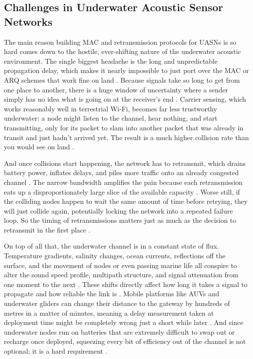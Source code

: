 \documentclass{article}
\begin{document}
\subsection{Challenges in Underwater Acoustic Sensor Networks}
The main reason building MAC and retransmission protocols for UASNs is so hard comes down to the hostile, ever-shifting nature of the underwater acoustic environment. The single biggest headache is the long and unpredictable propagation delay, which makes it nearly impossible to just port over the MAC or ARQ schemes that work fine on land \cite{akyildiz2005,slottedfama2006}. Because signals take so long to get from one place to another, there is a huge window of uncertainty where a sender simply has no idea what is going on at the receiver's end \cite{casari2011,kulla2022}. Carrier sensing, which works reasonably well in terrestrial Wi-Fi, becomes far less trustworthy underwater: a node might listen to the channel, hear nothing, and start transmitting, only for its packet to slam into another packet that was already in transit and just hadn't arrived yet. The result is a much higher collision rate than you would see on land \cite{casari2011}.

And once collisions start happening, the network has to retransmit, which drains battery power, inflates delays, and piles more traffic onto an already congested channel \cite{kulla2022,uwmac2007}. The narrow bandwidth amplifies the pain because each retransmission eats up a disproportionately large slice of the available capacity \cite{akyildiz2005,jiang2018}. Worse still, if the colliding nodes happen to wait the same amount of time before retrying, they will just collide again, potentially locking the network into a repeated failure loop. So the timing of retransmissions matters just as much as the decision to retransmit in the first place \cite{dao2025}.

On top of all that, the underwater channel is in a constant state of flux. Temperature gradients, salinity changes, ocean currents, reflections off the surface, and the movement of nodes or even passing marine life all conspire to alter the sound speed profile, multipath structure, and signal attenuation from one moment to the next \cite{casari2011,molinares2009}. These shifts directly affect how long it takes a signal to propagate and how reliable the link is \cite{casari2011,molinares2009}. Mobile platforms like AUVs and underwater gliders can change their distance to the gateway by hundreds of metres in a matter of minutes, meaning a delay measurement taken at deployment time might be completely wrong just a short while later \cite{cho2018}. And since underwater nodes run on batteries that are extremely difficult to swap out or recharge once deployed, squeezing every bit of efficiency out of the channel is not optional; it is a hard requirement \cite{kulla2022,uwmac2007}.
\end{document}
